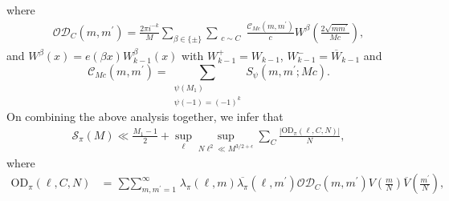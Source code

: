 \documentclass[12pt,a4paper,twoside, reqno]{amsart}
\begin{document}
where
\begin{align}\label{OD}
   {\mathcal{O}\mathcal{D}}_C(m, m^\prime)=\frac{2 \pi i^{-k}}{M} \sum_{\beta \in \{\pm\}}
\mathop{\sum}_{\substack{c \sim C \\  }} \frac{\mathcal{C}_{Mc}(m, m^\prime)}{c} W^{\beta}\left(\frac{2 \sqrt{mm^\prime}}{Mc}\right),
\end{align}
and
$W^{\beta}(x)=e(\beta x)W_{k-1}^{\beta}(x)$ with
$W_{k-1}^{+}=W_{k-1}$, $W_{k-1}^{-}=\overline{W}_{k-1}$ and 
\[\mathcal{C}_{Mc}(m,m^\prime)=\mathop{\sum}_{ \substack{\psi(M_1) \\ \psi(-1)=(-1)^k}}
  {S_\psi(m,m^\prime;Mc)}.\]
 On combining  the above analysis together, we infer that 
\begin{align}\label{S M after peter}
    \mathcal{S}_\pi(M) 
     \ll \frac{M_1-1}{2}+\sup_\ell \sup_{N\ell^2 \ll M^{3/2+\epsilon}} \sum_{C   }\frac{|\mathrm{OD}_{\pi}(\ell,C, N)| }{N},
\end{align}
where 
    \begin{align}\label{OD coprime}
         \mathrm{OD}_{\pi}(\ell,C, N)&= \mathop{\sum\sum}_{m,m^\prime=1}^\infty \lambda_\pi (\ell, m) \overline{\lambda_{\pi}}(\ell,m^\prime) {\mathcal{O} \mathcal{D}}_C(m,m^\prime) V\left(\frac{m}{N}\right)\overline{V}\left(\frac{m^\prime}{N}\right),
         \end{align}
\end{document}
